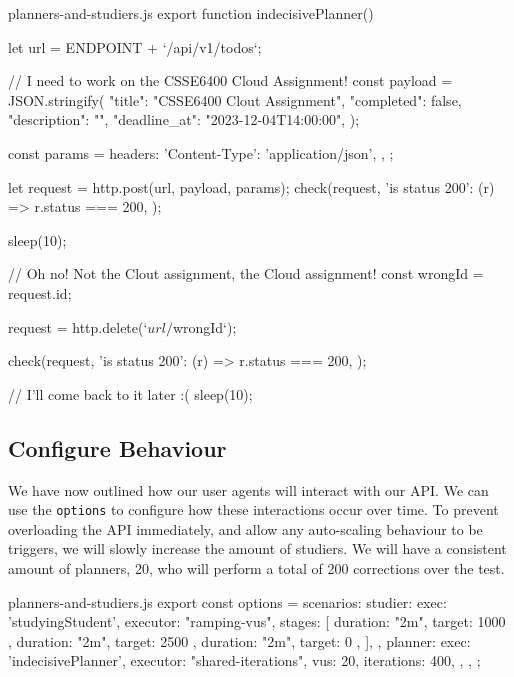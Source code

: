 \documentclass{csse4400}
\begin{document}
\begin{code}[language=JavaScript,numbers=none]{planners-and-studiers.js}
export function indecisivePlanner() {
    let url = ENDPOINT + `/api/v1/todos`;

    // I need to work on the CSSE6400 Cloud Assignment!
    const payload = JSON.stringify({
        "title": "CSSE6400 Clout Assignment",
        "completed": false,
        "description": "",
        "deadline_at": "2023-12-04T14:00:00",
    });

    const params = {
        headers: {
            'Content-Type': 'application/json',
        },
    };

    let request = http.post(url, payload, params);
    check(request, {
        'is status 200': (r) => r.status === 200,
    });

    sleep(10);

    // Oh no! Not the Clout assignment, the Cloud assignment!
    const wrongId = request.id;

    request = http.delete(`${url}/${wrongId}`);

    check(request, {
        'is status 200': (r) => r.status === 200,
    });

    // I'll come back to it later :(
    sleep(10);
}
\end{code}

\subsection{Configure Behaviour}

We have now outlined how our user agents will interact with our API.
We can use the \texttt{options} to configure how these interactions occur over time.
To prevent overloading the API immediately,
and allow any auto-scaling behaviour to be triggers,
we will slowly increase the amount of studiers.
We will have a consistent amount of planners, 20,
who will perform a total of 200 corrections over the test.

\begin{code}[language=JavaScript,numbers=none]{planners-and-studiers.js}
export const options = {
    scenarios: {
        studier: {
            exec: 'studyingStudent',
            executor: "ramping-vus",
            stages: [
                { duration: "2m", target: 1000 },
                { duration: "2m", target: 2500 },
                { duration: "2m", target: 0 },
            ],
        },
        planner: {
            exec: 'indecisivePlanner',
            executor: "shared-iterations",
            vus: 20,
            iterations: 400,
        },
    },
};
\end{code}
\end{document}
